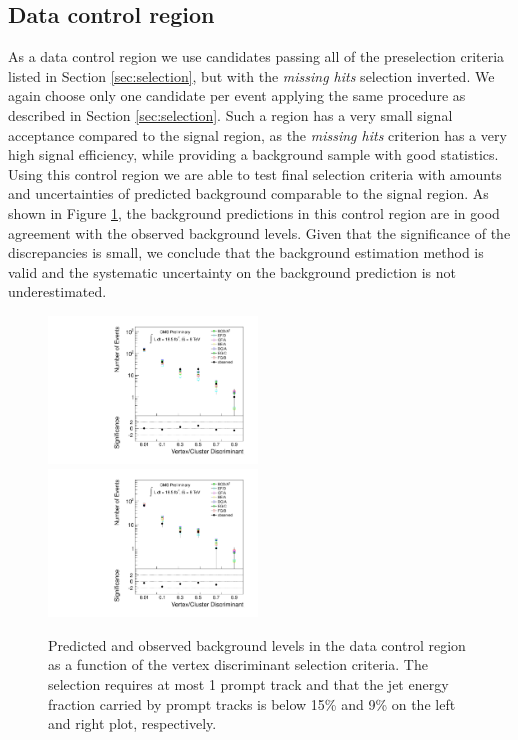 \subsection{Data control region}
\label{subsec:bkgCtrl}

As a data control region we use candidates passing all of the preselection criteria listed in Section
 \ref{sec:selection}, but with the {\it missing hits} selection inverted. We again choose only 
 one candidate per event applying the same procedure as described in Section \ref{sec:selection}.
 Such a region has a very small 
signal acceptance compared to the signal region, as the {\it missing hits} criterion has a very high signal 
efficiency, while providing a
background sample with good statistics. Using this control region we are able to test final selection
criteria with amounts and uncertainties of predicted background comparable to the signal region. 
 As shown in Figure \ref{fig:bkg_NMiss}, 
the background predictions in this control region are in good agreement 
with the observed background levels. Given that the significance
of the discrepancies is small, we conclude
that the background estimation method is valid and the systematic uncertainty on the background
 prediction is not underestimated.

\begin{figure}[htbp]
\centering
\includegraphics[width=0.495\textwidth]{plots/background/bkg_NMiss1.pdf}
\includegraphics[width=0.495\textwidth]{plots/background/bkg_NMiss2.pdf}
\caption{Predicted and observed background levels in the data control region as a function of the vertex
discriminant selection criteria. The selection requires at most 1 prompt track and that the jet energy fraction carried by prompt tracks is
below 15\% and 9\% on the left and right plot, respectively.\label{fig:bkg_NMiss}}
\end{figure}

